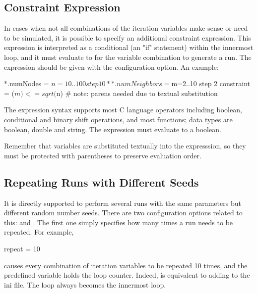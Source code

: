 \subsection{Constraint Expression}
\label{sec:config-sim:constraint-expression}

In cases when not all combinations of the iteration variables make sense
or need to be simulated, it is possible to specify an additional
constraint expression. This expression is interpreted as a conditional
(an "if" statement) within the innermost
loop, and it must evaluate to  for
the variable combination to generate a run. The expression should be
given with the  configuration option. An example:

\begin{inifile}
*.numNodes = ${n=10..100 step 10}
**.numNeighbors = ${m=2..10 step 2}
constraint = ($m) <= sqrt($n)  # note: parens needed due to textual substitution
\end{inifile}

The expression syntax supports most C language operators including boolean,
conditional and binary shift operations, and most  functions;
data types are boolean, double and string. The expression must evaluate to
a boolean.

\begin{note}
Remember that variables are substituted textually into the expresssion, so
they must be protected with parentheses to preserve evaluation order.
\end{note}


\subsection{Repeating Runs with Different Seeds}
\label{sec:config-sim:repeating-runs-with-different-seeds}

It is directly supported to perform several runs with the same
parameters but different random number seeds. There are two
configuration options related to this:  and .
The first one simply specifies how many times a run needs to be repeated. For
example,

\begin{inifile}
repeat = 10
\end{inifile}

causes every combination of iteration variables to be repeated 10 times,
and the  predefined variable holds the loop counter.
Indeed,  is equivalent to adding 
to the ini file. The  loop always becomes the innermost loop.

